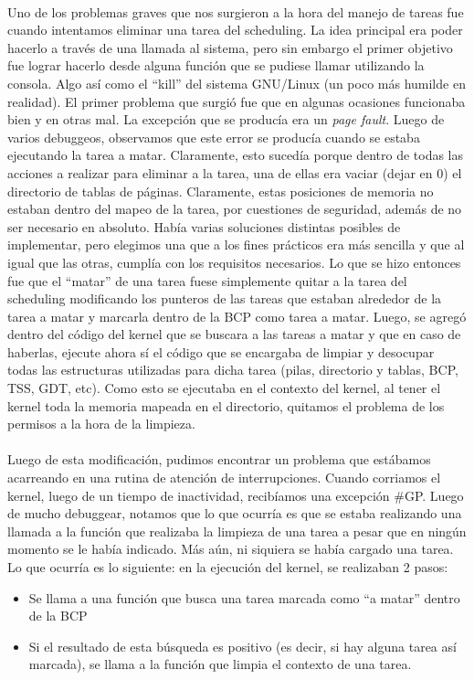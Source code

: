 \documentclass[11pt, a4paper]{article}
\begin{document}
	\paragraph{}
	Uno de los problemas graves que nos surgieron a la hora del manejo de tareas fue cuando intentamos eliminar una tarea del scheduling. La idea principal era poder hacerlo a través de una llamada al sistema, pero sin embargo el primer objetivo fue lograr hacerlo desde alguna función que se pudiese llamar utilizando la consola. Algo así como el ``kill'' del sistema GNU/Linux (un poco más humilde en realidad). El primer problema que surgió fue que en algunas ocasiones funcionaba bien y en otras mal. La excepción que se producía era un \textit{page fault}. Luego de varios debuggeos, observamos que este error se producía cuando se estaba ejecutando la tarea a matar. Claramente, esto sucedía porque dentro de todas las acciones a realizar para eliminar a la tarea, una de ellas era vaciar (dejar en 0) el directorio de tablas de páginas. Claramente, estas posiciones de memoria no estaban dentro del mapeo de la tarea, por cuestiones de seguridad, además de no ser necesario en absoluto. Había varias soluciones distintas posibles de implementar, pero elegimos una que a los fines prácticos era más sencilla y que al igual que las otras, cumplía con los requisitos necesarios. Lo que se hizo entonces fue que el ``matar'' de una tarea fuese simplemente quitar a la tarea del scheduling modificando los punteros de las tareas que estaban alrededor de la tarea a matar y marcarla dentro de la BCP como tarea a matar. Luego, se agregó dentro del código del kernel que se buscara a las tareas a matar y que en caso de haberlas, ejecute ahora sí el código que se encargaba de limpiar y desocupar todas las estructuras utilizadas para dicha tarea (pilas, directorio y tablas, BCP, TSS, GDT, etc). Como esto se ejecutaba en el contexto del kernel, al tener el kernel toda la memoria mapeada en el directorio, quitamos el problema de los permisos a la hora de la limpieza. 

	\paragraph{}
	Luego de esta modificación, pudimos encontrar un problema que estábamos acarreando en una rutina de atención de interrupciones. Cuando corriamos el kernel, luego de un tiempo de inactividad, recibíamos una excepción \#GP. Luego de mucho debuggear, notamos que lo que ocurría es que se estaba realizando una llamada a la función que realizaba la limpieza de una tarea a pesar que en ningún momento se le había indicado. Más aún, ni siquiera se había cargado una tarea. Lo que ocurría es lo siguiente: en la ejecución del kernel, se realizaban 2 pasos:
	\begin{itemize}
		\item Se llama a una función que busca una tarea marcada como ``a matar'' dentro de la BCP
		\item Si el resultado de esta búsqueda es positivo (es decir, si hay alguna tarea así marcada), se llama a la función que limpia el contexto de una tarea.
	\end{itemize}
\end{document}
